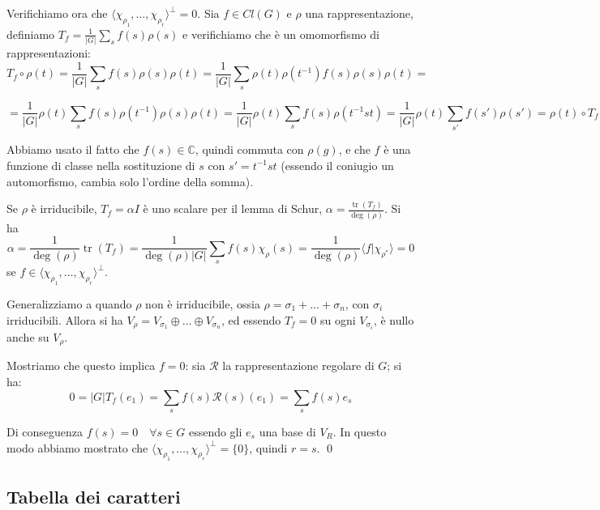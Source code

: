 \documentclass[11pt]{article}
\theoremstyle{plain}
\theoremstyle{definition}
\theoremstyle{remark}
\newcommand{\C}{\mathbb{C}}
\newcommand{\dsum}{\displaystyle\sum}
\DeclareMathOperator{\tr}{tr}
\begin{document}
Verifichiamo ora che $\langle \chi_{\rho_1}, \ldots, \chi_{\rho_r} \rangle ^{\perp} = {0}$. Sia $f \in Cl(G)$ e $\rho$ una rappresentazione,
definiamo $T_f= \frac{1}{|G|}\dsum_s f(s)\rho(s)$ e verifichiamo che è un omomorfismo di rappresentazioni: 
$$ T_f \circ \rho(t) = \frac{1}{|G|}\dsum_s f(s)\rho(s) \rho(t) = \frac{1}{|G|}\dsum_s \rho(t) \rho(t^{-1}) f(s)\rho(s) \rho(t) =$$

$$= \frac{1}{|G|}\rho(t) \dsum_s f(s) \rho(t^{-1}) \rho(s) \rho(t) = \frac{1}{|G|}\rho(t) \dsum_s f(s) \rho(t^{-1}st) = 
\frac{1}{|G|}\rho(t) \dsum_{s'} f(s') \rho(s')= \rho(t) \circ T_f$$

Abbiamo usato il fatto che $f(s)\in \C$, quindi commuta con $\rho(g)$, e che $f$ è una funzione di classe nella 
sostituzione di $s$ con $s'= t^{-1}st$ (essendo il coniugio un automorfismo, cambia solo l'ordine della somma).

Se $\rho$ è irriducibile, $T_f= \alpha I$ è uno scalare per il lemma di Schur, $\alpha= \frac{\tr(T_f)}{\deg(\rho)}$.
Si ha $$\alpha =\frac{1}{\deg(\rho)}\tr(T_f)=\frac{1}{\deg(\rho)|G|}\dsum_s f(s) \chi_\rho(s)=
\frac{1}{\deg(\rho)} \langle f | \chi_{\rho^*} \rangle = 0$$ se $f \in \langle \chi_{\rho_1}, \ldots, \chi_{\rho_r} \rangle ^{\perp}$.

Generalizziamo a quando $\rho$ non è irriducibile, ossia $\rho = \sigma_1+ \ldots + \sigma_n$, con $\sigma_i$ irriducibili. Allora 
si ha $V_\rho = V_{\sigma_1}  \oplus \ldots \oplus V_{\sigma_n}$, ed essendo $T_f=0 $ su ogni $V_{\sigma_i}$, è nullo anche su $V_\rho$.

Mostriamo che questo implica $f=0$: sia $\mathcal{R}$ la rappresentazione regolare di $G$; si ha:
$$ 0= |G| T_f (e_1) = \dsum_s f(s) \mathcal{R}(s)(e_1) = \dsum_s f(s) e_s $$

Di conseguenza $f(s)=0 \quad \forall s \in G$ essendo gli $e_s$ una base di $V_R$.
In questo modo abbiamo mostrato che $\langle \chi_{\rho_1}, \ldots, \chi_{\rho_r} \rangle ^{\perp} = \{0\}$, quindi $r=s$.
\qed

















\subsection{Tabella dei caratteri}
\end{document}
